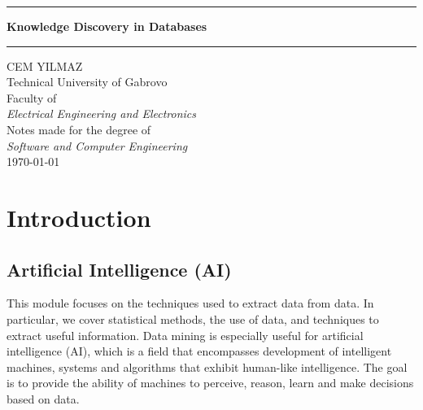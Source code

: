 \documentclass[a4paper, 12pt]{article}
\newcommand{\coloredrule}[2][tugblue]{%
  \textcolor{#1}{\rule{\linewidth}{#2}}%
}
\theoremstyle{plain}
\theoremstyle{definition}
\theoremstyle{remark}
\begin{document}
	\begin{titlepage}
	        \vspace*{0.8cm}
	        \begin{center}
	                \coloredrule{2pt}\par
	                \vskip 0.6cm
	                \textbf{\Huge Knowledge Discovery in Databases}\par
	                \vskip 0.3cm
	                \coloredrule{2pt}\par
	
	                \vskip 3cm
	
	                
	
	                \vspace{3cm} %
	                \Large CEM YILMAZ \\
	                \Large Technical University of Gabrovo \\
	                \Large Faculty of \\
	                \Large\textit{Electrical Engineering and Electronics}\\
	
	                \vspace{2cm}
	                \Large Notes made for the degree of\\
	                \Large \textit{Software and Computer Engineering}\\
	                \Large \today \\
	                \vspace{0.5cm}
	
	                \vfill  %
	        \end{center}
	\end{titlepage}
	
	\tableofcontents
	\newpage
	\section{Introduction}
	\subsection{Artificial Intelligence (AI)}
\noindent This module focuses on the techniques used to extract data from data. In particular, we cover statistical methods, the use of data, and techniques to extract useful information. Data mining is especially useful for artificial intelligence (AI), which is a field that encompasses development of intelligent machines, systems and algorithms that exhibit human-like intelligence. The goal is to provide the ability of machines to perceive, reason, learn and make decisions based on data.
\end{document}
